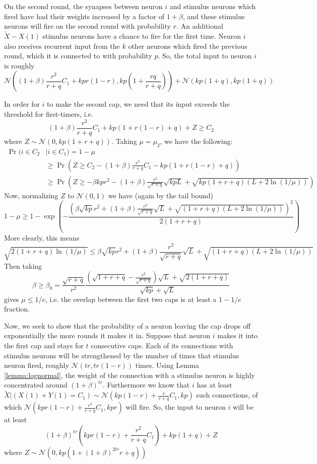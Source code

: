 \documentclass[final,12pt]{colt2022} %
\begin{document}
On the second round, the synapses between neuron $i$ and stimulus neurons which fired have had their weights increased by a factor of $1 + \beta$, and these stimulus neurons will fire on the second round with probability $r$. An additional $\tilde X - X(1)$ stimulus neurons have a chance to fire for the first time. Neuron $i$ also receives recurrent input from the $k$ other neurons which fired the previous round, which it is connected to with probability $p$. So, the total input to neuron $i$ is roughly \[\mathcal N\left((1 + \beta)\frac{r^2}{r+q}C_1 + kpr(1-r), kp\left(1 + \frac{rq}{r+q}\right)\right) + \mathcal N(kp(1+q), kp(1+q))\]

In order for $i$ to make the second cap, we need that its input exceeds the threshold for first-timers, i.e. \[(1+\beta)\frac{r^2}{r+q}C_1 + kp(1+ r(1-r)+q) + Z \geq C_2\] where $Z \sim \mathcal N\left(0, kp(1 + r + q)\right)$. Taking $\mu = \mu_2$, we have the following: \begin{align*}
    \Pr (i \in C_2 &| i \in C_1) = 1 - \mu\\
    &\geq \Pr \left(Z \geq C_2 - (1+\beta)\frac{r^2}{r+q}C_1 - kp(1+ r(1-r)+q)\right)\\
    &\geq \Pr \left(Z \geq -\beta kpr^2 - (1+\beta)\frac{r^2}{\sqrt{r+q}}\sqrt{kpL} + \sqrt{kp(1+r + q)(L + 2\ln(1/\mu))}\right)
\end{align*}
Now, normalizing $Z$ to $\mathcal N(0, 1)$ we have (again by the tail bound) \[1 - \mu \geq 1 - \exp\left(-\frac{\left(\beta \sqrt{kp}r^2 + (1+\beta)\frac{r^2}{\sqrt{r+q}}\sqrt{L} + \sqrt{(1+r + q)(L + 2\ln(1/\mu))}\right)^2}{2(1+r+q)}\right)\] 
More clearly, this means \[\sqrt{2(1+r+q)\ln(1/\mu)} \leq \beta \sqrt{kp}r^2 + (1+\beta)\frac{r^2}{\sqrt{r+q}}\sqrt{L} + \sqrt{(1+r + q)(L + 2\ln(1/\mu))}\] 
Then taking \[\beta \geq \beta_0 = \frac{\sqrt{r+q}}{r^2}\frac{\left(\sqrt{1+r+q} - \frac{r^2}{\sqrt{r+q}}\right)\sqrt{L} + \sqrt{2(1 + r+q)}}{\sqrt{kp} + \sqrt{L}}\] gives $\mu \leq 1/e$, i.e. the overlap between the first two caps is at least a $1 - 1/e$ fraction.

Now, we seek to show that the probability of a neuron leaving the cap drops off exponentially the more rounds it makes it in. Suppose that neuron $i$ makes it into the first cap and stays for $t$ consecutive caps. Each of its connections with stimulus neurons will be strengthened by the number of times that stimulus neuron fired, roughly $\mathcal N(tr, tr(1-r))$ times. Using Lemma \ref{lemma:lognormal}, the weight of the connection with a stimulus neuron is highly concentrated around $(1+\beta)^{tr}$. Furthermore we know that $i$ has at least $\tilde X | (X(1) + Y(1) = C_1) \sim \mathcal N\left(kp(1-r) + \frac{r}{r + q}C_1, kp\right)$ such connections, of which $\mathcal N\left(kpr(1-r) + \frac{r^2}{r + q}C_1, kpr\right)$ will fire. So, the input to neuron $i$ will be at least \[(1+\beta)^{tr}(kpr(1-r) + \frac{r^2}{r + q}C_1) + kp(1+q) + Z\] where $Z \sim \mathcal N(0, kp(1 + (1+\beta)^{2tr}r+q))$
\end{document}
